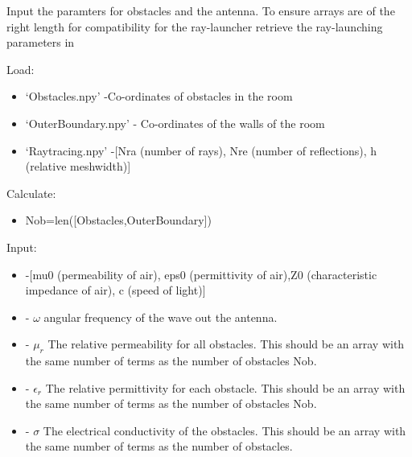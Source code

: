 \documentclass[letterpaper,10pt,english]{sphinxmanual}
\begin{document}

\begin{fulllineitems}
\label{index:ParameterInput.ObstacleCoefficients}
Input the paramters for obstacles and the antenna. To ensure   arrays are of the right length for compatibility for the   ray-launcher retrieve the ray-launching parameters in   {\hyperref[index:ParameterInput.DeclareParameters]{}}

Load:
\begin{itemize}
\item {} 
`Obstacles.npy'     -Co-ordinates of obstacles in the room

\item {} 
`OuterBoundary.npy' - Co-ordinates of the walls of the room

\item {} 
`Raytracing.npy'    -{[}Nra (number of rays), Nre (number of reflections),   h (relative meshwidth){]}

\end{itemize}

Calculate:
\begin{itemize}
\item {} 
Nob=len({[}Obstacles,OuterBoundary{]})

\end{itemize}

Input:
\begin{itemize}
\item {} 
 -{[}mu0 (permeability of air),   eps0 (permittivity of air),Z0 (characteristic impedance of air),   c (speed of light){]}

\item {} 
 - \(\omega\) angular frequency of the wave out   the antenna.

\item {} 
       - \(\mu_r\) The relative permeability for all obstacles.   This should be an array with the same number of terms as the number   of obstacles Nob.

\item {} 
     - \(\epsilon_r\) The relative permittivity for each obstacle.   This should be an array with the same number of terms as the number   of obstacles Nob.

\item {} 
     - \(\sigma\) The electrical conductivity of the obstacles.   This should be an array with the same number of terms as the number   of obstacles.


\end{itemize}
\end{fulllineitems}
\end{document}
